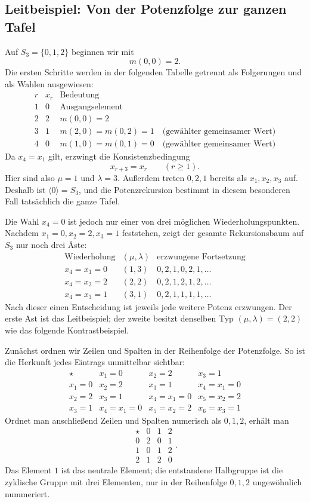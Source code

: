 \documentclass[main.tex]{subfiles}
\begin{document}
\subsection{Leitbeispiel: Von der Potenzfolge zur ganzen Tafel}

Auf \(S_3=\{0,1,2\}\) beginnen wir mit
\[
  m(0,0)=2.
\]
Die ersten Schritte werden in der folgenden Tabelle getrennt als
Folgerungen und als Wahlen ausgewiesen:
\[
\begin{array}{c|c|l}
r&x_r&\text{Bedeutung}\\\hline
1&0&\text{Ausgangselement}\\
2&2&m(0,0)=2\\
3&1&m(2,0)=m(0,2)=1\quad\text{(gewählter gemeinsamer Wert)}\\
4&0&m(1,0)=m(0,1)=0\quad\text{(gewählter gemeinsamer Wert)}
\end{array}
\]
Da \(x_4=x_1\) gilt, erzwingt die Konsistenzbedingung
\[
  x_{r+3}=x_r
  \qquad(r\geq1).
\]
Hier sind also \(\mu=1\) und \(\lambda=3\).  Außerdem treten \(0,2,1\)
bereits als \(x_1,x_2,x_3\) auf.  Deshalb ist
\(\langle0\rangle=S_3\), und die Potenzrekursion bestimmt in diesem
besonderen Fall tatsächlich die ganze Tafel.

Die Wahl \(x_4=0\) ist jedoch nur einer von drei möglichen
Wiederholungspunkten.  Nachdem \(x_1=0,x_2=2,x_3=1\) feststehen, zeigt der
gesamte Rekursionsbaum auf \(S_3\) nur noch drei Äste:
\[
\begin{array}{c|c|c}
\text{Wiederholung}&(\mu,\lambda)&\text{erzwungene Fortsetzung}\\\hline
x_4=x_1=0&(1,3)&0,2,1,0,2,1,\ldots\\
x_4=x_2=2&(2,2)&0,2,1,2,1,2,\ldots\\
x_4=x_3=1&(3,1)&0,2,1,1,1,1,\ldots
\end{array}
\]
Nach dieser einen Entscheidung ist jeweils jede weitere Potenz erzwungen.
Der erste Ast ist das Leitbeispiel; der zweite besitzt denselben Typ
\((\mu,\lambda)=(2,2)\) wie das folgende Kontrastbeispiel.

Zunächst ordnen wir Zeilen und Spalten in der Reihenfolge der Potenzfolge.
So ist die Herkunft jedes Eintrags unmittelbar sichtbar:
\[
\boxed{
\begin{array}{c|ccc}
\star&x_1=0&x_2=2&x_3=1\\\hline
x_1=0&x_2=2&x_3=1&x_4=x_1=0\\
x_2=2&x_3=1&x_4=x_1=0&x_5=x_2=2\\
x_3=1&x_4=x_1=0&x_5=x_2=2&x_6=x_3=1
\end{array}}
\]
Ordnet man anschließend Zeilen und Spalten numerisch als \(0,1,2\), erhält
man
\[
\begin{array}{c|ccc}
\star&0&1&2\\\hline
0&2&0&1\\
1&0&1&2\\
2&1&2&0
\end{array}.
\]
Das Element \(1\) ist das neutrale Element; die entstandene Halbgruppe ist
die zyklische Gruppe mit drei Elementen, nur in der Reihenfolge
\(0,1,2\) ungewöhnlich nummeriert.
\end{document}
